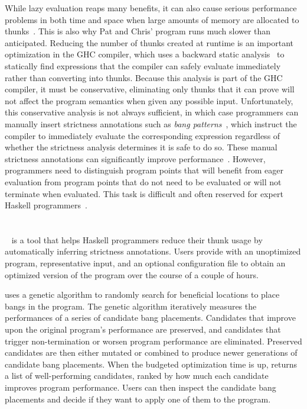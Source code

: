 While lazy evaluation reaps many benefits, it can also cause serious
performance problems in both time and space when large amounts of
memory are allocated to thunks~\cite{Jones94,Santos98,Ennals03}. This is
also why Pat and Chris' program runs much slower than anticipated.
Reducing the number of thunks created at runtime is an important
optimization in the GHC compiler, which uses a backward static
analysis~\cite{Sergey14} to statically find expressions that the
compiler can safely evaluate immediately rather than converting into
thunks. Because this analysis is part of the GHC compiler, it must be
conservative, eliminating only thunks that it can prove will not
affect the program semantics when given any possible input.
Unfortunately, this conservative analysis is not always sufficient, in
which case programmers can manually insert strictness annotations such
as \textit{bang patterns}~\cite{bang}, which instruct the compiler to
immediately evaluate the corresponding expression regardless of
whether the strictness analysis determines it is safe to do so. These
manual strictness annotations can significantly improve
performance~\cite[Chapter~25]{rwh}. However, programmers need to
distinguish program points that will benefit from eager evaluation
from program points that do not need to be evaluated or will not
terminate when evaluated. This task is difficult and often reserved
for expert Haskell programmers~\cite{Mitchell13}.


\section{\Ao}

\Ao~\cite{autobahn-wang} is a tool that helps Haskell programmers
reduce their thunk usage by automatically inferring strictness
annotations. Users provide \Ao{} with an unoptimized
program, representative input, and an optional configuration file to
obtain an optimized version of the program over the course of a couple
of hours.

\Ao{} uses a genetic algorithm to randomly search for
beneficial locations to place bangs in the program. The genetic
algorithm iteratively measures the performances of a series of
candidate bang placements. Candidates that improve upon the original
program's performance are preserved, and candidates that trigger
non-termination or worsen program performance are
eliminated. Preserved candidates are then either mutated or combined to produce newer generations of candidate bang placements. When the budgeted optimization time is up, \Ao{} returns a list
of well-performing candidates, ranked by how much each candidate
improves program performance. Users can then inspect the candidate
bang placements and decide if they want to apply one of them to the
program.

